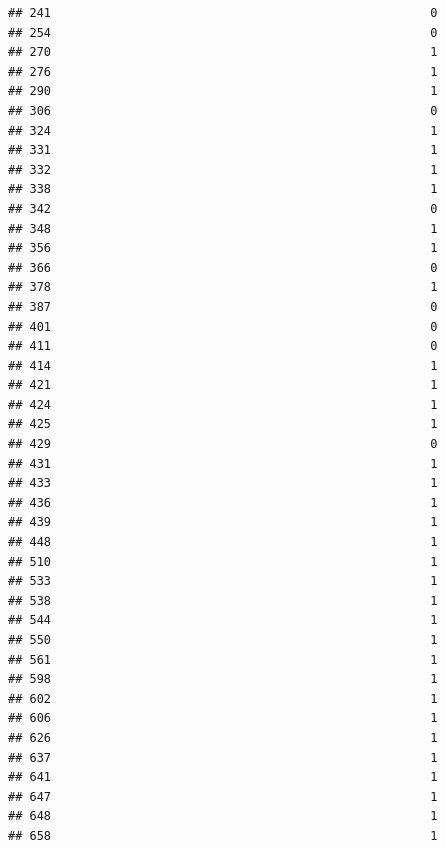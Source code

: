 \documentclass[
]{article}
\begin{document}
\begin{verbatim}
## 241                                                     0
## 254                                                     0
## 270                                                     1
## 276                                                     1
## 290                                                     1
## 306                                                     0
## 324                                                     1
## 331                                                     1
## 332                                                     1
## 338                                                     1
## 342                                                     0
## 348                                                     1
## 356                                                     1
## 366                                                     0
## 378                                                     1
## 387                                                     0
## 401                                                     0
## 411                                                     0
## 414                                                     1
## 421                                                     1
## 424                                                     1
## 425                                                     1
## 429                                                     0
## 431                                                     1
## 433                                                     1
## 436                                                     1
## 439                                                     1
## 448                                                     1
## 510                                                     1
## 533                                                     1
## 538                                                     1
## 544                                                     1
## 550                                                     1
## 561                                                     1
## 598                                                     1
## 602                                                     1
## 606                                                     1
## 626                                                     1
## 637                                                     1
## 641                                                     1
## 647                                                     1
## 648                                                     1
## 658                                                     1

\end{verbatim}
\end{document}
